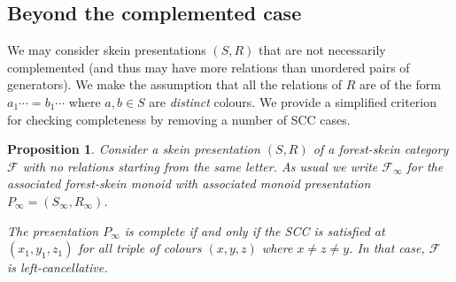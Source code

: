 \documentclass[a4paper, 12pt]{amsart}
\numberwithin{equation}{section}
\newtheorem{proposition}[theorem]{Proposition}
\theoremstyle{definition}
\newcommand{\cF}{\mathcal F}
\begin{document}
\subsection{Beyond the complemented case}
We may consider skein presentations $(S,R)$ that are not necessarily complemented (and thus may have more relations than unordered pairs of generators).
We make the assumption that all the relations of $R$ are of the form $a_{1}\cdots=b_{1}\cdots$ where $a,b\in S$ are {\it distinct} colours.
We provide a simplified criterion for checking completeness by removing a number of SCC cases.

\begin{proposition}
Consider a skein presentation $(S,R)$ of a forest-skein category $\cF$ with no relations starting from the same letter.
As usual we write $\cF_\infty$ for the associated forest-skein monoid with associated monoid presentation $P_\infty=(S_\infty,R_\infty)$.

The presentation $P_\infty$ is complete if and only if the SCC is satisfied at $(x_1,y_1,z_1)$ for all triple of colours $(x,y,z)$ where $x\neq z\neq y$.
In that case, $\cF$ is left-cancellative.
\end{proposition}
\end{document}
